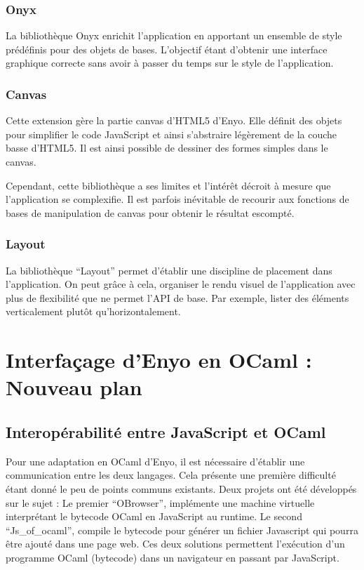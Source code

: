 \documentclass[11pt,a4paper]{report}
\begin{document}
\subsection{Onyx}

La bibliothèque Onyx enrichit l'application en apportant un ensemble de style prédéfinis pour 
des objets de bases. L'objectif étant d'obtenir une interface graphique correcte sans avoir
à passer du temps sur le style de l'application.

\subsection{Canvas}

Cette extension gère la partie canvas d'HTML5 d'Enyo. Elle définit des objets pour simplifier 
le code JavaScript et ainsi s'abstraire légèrement de la couche basse d'HTML5. Il est ainsi
possible de dessiner des formes simples dans le canvas.

Cependant, cette bibliothèque a ses limites et l'intérêt décroit à mesure que l'application se complexifie.
Il est parfois inévitable de recourir aux fonctions de bases de manipulation de canvas pour obtenir
le résultat escompté.

\subsection{Layout}

La bibliothèque ``Layout'' permet d'établir une discipline de placement dans l'application.
On peut grâce à cela, organiser le rendu visuel de l'application avec plus de flexibilité
que ne permet l'API de base. Par exemple, lister des éléments verticalement plutôt qu'horizontalement.

\chapter{Interfaçage d'Enyo en OCaml : Nouveau plan}\label{chap:model}

\section{Interopérabilité entre JavaScript et OCaml}

Pour une adaptation en OCaml d'Enyo, il est nécessaire d'établir une communication
entre les deux langages. Cela présente une première difficulté étant donné le peu
de points communs existants. Deux projets ont été développés sur le sujet : Le premier 
``OBrowser''\cite{pwt}, implémente une machine virtuelle interprétant le bytecode OCaml
en JavaScript au runtime. Le second ``Js\_of\_ocaml'', compile le bytecode pour générer
un fichier Javascript qui pourra être ajouté dans une page web. Ces deux solutions
permettent l'exécution d'un programme OCaml (bytecode) dans un navigateur en passant par JavaScript. 
\end{document}
